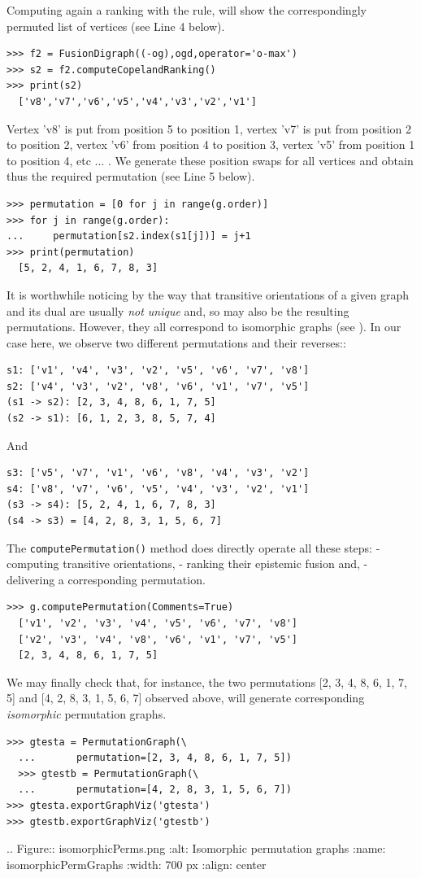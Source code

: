 Computing again a ranking with the \Copeland rule, will show the correspondingly permuted list of vertices (see Line 4 below).
\begin{lstlisting}
>>> f2 = FusionDigraph((-og),ogd,operator='o-max')
>>> s2 = f2.computeCopelandRanking()
>>> print(s2)
  ['v8','v7','v6','v5','v4','v3','v2','v1']
\end{lstlisting}
Vertex 'v8' is put from position 5 to position 1, vertex 'v7' is put from position 2 to position 2, vertex 'v6' from position 4 to position 3, vertex 'v5' from position 1 to position 4, etc ... . We generate these position swaps for all vertices and obtain thus the required permutation (see Line 5 below).
\begin{lstlisting}
>>> permutation = [0 for j in range(g.order)]
>>> for j in range(g.order):
...     permutation[s2.index(s1[j])] = j+1
>>> print(permutation)
  [5, 2, 4, 1, 6, 7, 8, 3]
\end{lstlisting}

It is worthwhile noticing by the way that transitive orientations of a given graph and its dual are usually \emph{not unique} and, so may also be the resulting permutations. However, they all correspond to isomorphic graphs (see \citep{GOL-2004}). In our case here, we observe two different permutations and their reverses::
\begin{lstlisting}
s1: ['v1', 'v4', 'v3', 'v2', 'v5', 'v6', 'v7', 'v8']
s2: ['v4', 'v3', 'v2', 'v8', 'v6', 'v1', 'v7', 'v5']
(s1 -> s2): [2, 3, 4, 8, 6, 1, 7, 5]
(s2 -> s1): [6, 1, 2, 3, 8, 5, 7, 4]
\end{lstlisting}
And
\begin{lstlisting}  
s3: ['v5', 'v7', 'v1', 'v6', 'v8', 'v4', 'v3', 'v2']
s4: ['v8', 'v7', 'v6', 'v5', 'v4', 'v3', 'v2', 'v1']
(s3 -> s4): [5, 2, 4, 1, 6, 7, 8, 3]
(s4 -> s3) = [4, 2, 8, 3, 1, 5, 6, 7]
\end{lstlisting}
The \texttt{computePermutation()} method does directly operate all these steps: - computing transitive orientations, - ranking their epistemic fusion and, - delivering a corresponding permutation.
\begin{lstlisting}  
>>> g.computePermutation(Comments=True)
  ['v1', 'v2', 'v3', 'v4', 'v5', 'v6', 'v7', 'v8']
  ['v2', 'v3', 'v4', 'v8', 'v6', 'v1', 'v7', 'v5']
  [2, 3, 4, 8, 6, 1, 7, 5]
\end{lstlisting}

We may finally check that, for instance, the two permutations [2, 3, 4, 8, 6, 1, 7, 5] and [4, 2, 8, 3, 1, 5, 6, 7] observed above, will generate corresponding \emph{isomorphic} permutation graphs.
\begin{lstlisting}  
>>> gtesta = PermutationGraph(\
  ...       permutation=[2, 3, 4, 8, 6, 1, 7, 5])
  >>> gtestb = PermutationGraph(\
  ...       permutation=[4, 2, 8, 3, 1, 5, 6, 7])
>>> gtesta.exportGraphViz('gtesta')
>>> gtestb.exportGraphViz('gtestb')
\end{lstlisting}
.. Figure:: isomorphicPerms.png
    :alt: Isomorphic permutation graphs
    :name: isomorphicPermGraphs
    :width: 700 px
    :align: center

